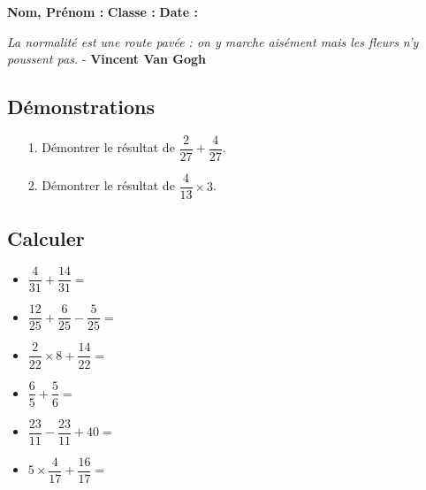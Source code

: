 \newpage

\textbf{Nom, Prénom :} \hspace{8cm} \textbf{Classe :} \hspace{3cm} \textbf{Date :}\\
\vspace{-0.8cm}
\begin{center}
  \textit{La normalité est une route pavée : on y marche aisément mais les fleurs n’y poussent pas.} - \textbf{Vincent Van Gogh}
\end{center}
\vspace{-0.8cm}

\subsection*{Démonstrations}

\begin{multicols}{2}
\begin{enumerate}
  \item[1.] Démontrer le résultat de $\dfrac{2}{27} + \dfrac{4}{27}$.  \\ \Pointilles[6] \columnbreak 
  \item[2.] Démontrer le résultat de $\dfrac{4}{13} \times 3$.  \\ \Pointilles[6]
\end{enumerate} 
\end{multicols}

\subsection*{Calculer}

\begin{itemize}[label={$\bullet$}]
\item $\dfrac{4}{31} + \dfrac{14}{31} =$ \dotfill \\
\item $\dfrac{12}{25} + \dfrac{6}{25} - \dfrac{5}{25} =$ \dotfill \\
\item $\dfrac{2}{22} \times 8 + \dfrac{14}{22} =$ \dotfill \\
\item $\dfrac{6}{5} + \dfrac{5}{6} =$ \dotfill \\
\item $\dfrac{23}{11} - \dfrac{23}{11} + 40 =$ \dotfill \\
\item $5 \times \dfrac{4}{17} + \dfrac{16}{17} =$ \dotfill \\
\end{itemize} 

